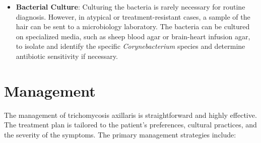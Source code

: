 \begin{itemize}
    \item \textbf{Bacterial Culture}: Culturing the bacteria is rarely necessary for routine diagnosis. However, in atypical or treatment-resistant cases, a sample of the hair can be sent to a microbiology laboratory. The bacteria can be cultured on specialized media, such as sheep blood agar or brain-heart infusion agar, to isolate and identify the specific \textit{Corynebacterium} species and determine antibiotic sensitivity if necessary.
\end{itemize}

\section*{Management}
The management of trichomycosis axillaris is straightforward and highly effective. The treatment plan is tailored to the patient's preferences, cultural practices, and the severity of the symptoms. The primary management strategies include:
